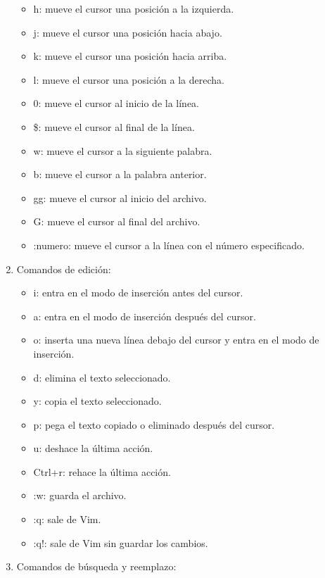 \documentclass[
  a4paper,
]{article}
\providecommand{\tightlist}{%
  \setlength{\itemsep}{0pt}\setlength{\parskip}{0pt}}\usepackage{longtable,booktabs,array}
\begin{document}
\begin{enumerate}
  \begin{itemize}
  \tightlist
  \item
    h: mueve el cursor una posición a la izquierda.
  \item
    j: mueve el cursor una posición hacia abajo.
  \item
    k: mueve el cursor una posición hacia arriba.
  \item
    l: mueve el cursor una posición a la derecha.
  \item
    0: mueve el cursor al inicio de la línea.
  \item
    \$: mueve el cursor al final de la línea.
  \item
    w: mueve el cursor a la siguiente palabra.
  \item
    b: mueve el cursor a la palabra anterior.
  \item
    gg: mueve el cursor al inicio del archivo.
  \item
    G: mueve el cursor al final del archivo.
  \item
    :numero: mueve el cursor a la línea con el número especificado.
  \end{itemize}
\item
  Comandos de edición:

  \begin{itemize}
  \tightlist
  \item
    i: entra en el modo de inserción antes del cursor.
  \item
    a: entra en el modo de inserción después del cursor.
  \item
    o: inserta una nueva línea debajo del cursor y entra en el modo de
    inserción.
  \item
    d: elimina el texto seleccionado.
  \item
    y: copia el texto seleccionado.
  \item
    p: pega el texto copiado o eliminado después del cursor.
  \item
    u: deshace la última acción.
  \item
    Ctrl+r: rehace la última acción.
  \item
    :w: guarda el archivo.
  \item
    :q: sale de Vim.
  \item
    :q!: sale de Vim sin guardar los cambios.
  \end{itemize}
\item
  Comandos de búsqueda y reemplazo:


\end{enumerate}
\end{document}

